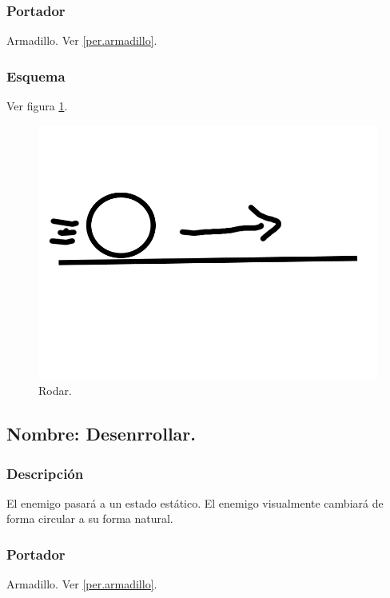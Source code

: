 \documentclass[11pt,letterpaper]{article}
\begin{document}
		\subsubsection{Portador}
		Armadillo. Ver \ref{per.armadillo}.
		\subsubsection{Esquema}
		Ver figura \ref{fig:rodar}.
		\begin{figure}
			\centering
			\includegraphics[height=0.2 \textheight]{Imagenes/rodar}
			\caption{Rodar.}
			\label{fig:rodar}
		\end{figure}
	\subsection{Nombre: Desenrrollar.} \label{hab.desenrrollar}
		\subsubsection{Descripción}
		El enemigo pasará a un estado estático. El enemigo visualmente cambiará de forma circular a su forma natural.
		\subsubsection{Portador}
		Armadillo. Ver \ref{per.armadillo}.
\end{document}
